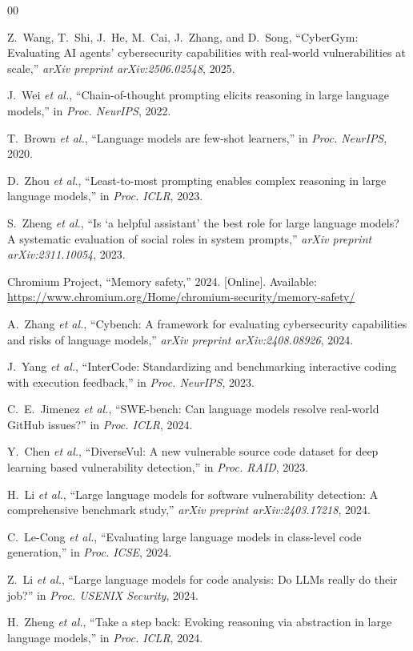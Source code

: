 \documentclass{ieeeaccess}
\begin{document}

\begin{thebibliography}{00}

 Z.~Wang, T.~Shi, J.~He, M.~Cai, J.~Zhang, and D.~Song, ``CyberGym: Evaluating AI agents' cybersecurity capabilities with real-world vulnerabilities at scale,'' \emph{arXiv preprint arXiv:2506.02548}, 2025.

 J.~Wei \emph{et al.}, ``Chain-of-thought prompting elicits reasoning in large language models,'' in \emph{Proc. NeurIPS}, 2022.

 T.~Brown \emph{et al.}, ``Language models are few-shot learners,'' in \emph{Proc. NeurIPS}, 2020.

 D.~Zhou \emph{et al.}, ``Least-to-most prompting enables complex reasoning in large language models,'' in \emph{Proc. ICLR}, 2023.

 S.~Zheng \emph{et al.}, ``Is `a helpful assistant' the best role for large language models? A systematic evaluation of social roles in system prompts,'' \emph{arXiv preprint arXiv:2311.10054}, 2023.

 Chromium Project, ``Memory safety,'' 2024. [Online]. Available: \url{https://www.chromium.org/Home/chromium-security/memory-safety/}

 A.~Zhang \emph{et al.}, ``Cybench: A framework for evaluating cybersecurity capabilities and risks of language models,'' \emph{arXiv preprint arXiv:2408.08926}, 2024.

 J.~Yang \emph{et al.}, ``InterCode: Standardizing and benchmarking interactive coding with execution feedback,'' in \emph{Proc. NeurIPS}, 2023.

 C.~E.~Jimenez \emph{et al.}, ``SWE-bench: Can language models resolve real-world GitHub issues?'' in \emph{Proc. ICLR}, 2024.

 Y.~Chen \emph{et al.}, ``DiverseVul: A new vulnerable source code dataset for deep learning based vulnerability detection,'' in \emph{Proc. RAID}, 2023.

 H.~Li \emph{et al.}, ``Large language models for software vulnerability detection: A comprehensive benchmark study,'' \emph{arXiv preprint arXiv:2403.17218}, 2024.

 C.~Le-Cong \emph{et al.}, ``Evaluating large language models in class-level code generation,'' in \emph{Proc. ICSE}, 2024.

 Z.~Li \emph{et al.}, ``Large language models for code analysis: Do LLMs really do their job?'' in \emph{Proc. USENIX Security}, 2024.

 H.~Zheng \emph{et al.}, ``Take a step back: Evoking reasoning via abstraction in large language models,'' in \emph{Proc. ICLR}, 2024.

\end{thebibliography}
\end{document}
